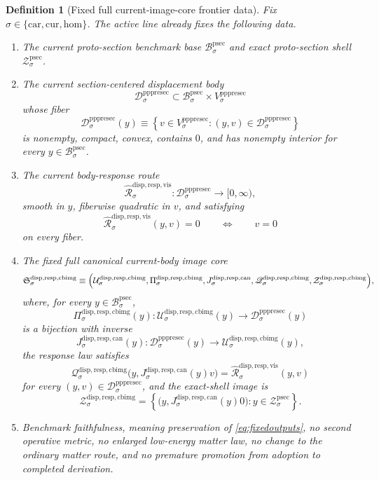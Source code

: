 \documentclass[11pt]{article}
\newcommand{\Car}{\mathrm{car}}
\newcommand{\Cur}{\mathrm{cur}}
\newcommand{\Hom}{\mathrm{hom}}
\newcommand{\ProtoSectionBody}[1]{\mathcal B_{#1}^{\mathrm{psec}}}
\newcommand{\ProtoSectionShell}[1]{\mathcal Z_{#1}^{\mathrm{psec}}}
\newcommand{\PrePreProtoSectionVertical}[1]{V_{#1}^{\mathrm{pppresec}}}
\newcommand{\PrePreProtoSectionResidualBody}[1]{\mathcal D_{#1}^{\mathrm{pppresec}}}
\newcommand{\CurrentBodyImageCore}{\mathfrak S^{\mathrm{disp,resp,cbimg}}}
\newcommand{\ImageProjection}[1]{\Pi_{#1}^{\mathrm{disp,resp,cbimg}}}
\newcommand{\CanonicalLift}[1]{J_{#1}^{\mathrm{disp,resp,can}}}
\newcommand{\CanonicalImageBody}[1]{\mathcal U_{#1}^{\mathrm{disp,resp,cbimg}}}
\newcommand{\CanonicalImageResponseLaw}[1]{\mathscr Q_{#1}^{\mathrm{disp,resp,cbimg}}}
\newcommand{\CanonicalImageShell}[1]{\mathcal Z_{#1}^{\mathrm{disp,resp,cbimg}}}
\newcommand{\CoreForcedBodyResponse}[1]{\widehat{\mathscr R}_{#1}^{\mathrm{disp,resp,vis}}}
\newtheorem{definition}{Definition}
\begin{document}
\begin{definition}[Fixed full current-image-core frontier data]
\label{def:frontier}
Fix \(\sigma\in\{\Car,\Cur,\Hom\}\). The active line already fixes the following data.
\begin{enumerate}
    \item The current proto-section benchmark base \(\ProtoSectionBody{\sigma}\) and exact proto-section shell \(\ProtoSectionShell{\sigma}\).
    \item The current section-centered displacement body
    \[
    \PrePreProtoSectionResidualBody{\sigma}
    \subset
    \ProtoSectionBody{\sigma}\times\PrePreProtoSectionVertical{\sigma}
    \]
    whose fiber
    \[
    \PrePreProtoSectionResidualBody{\sigma}(y)
    \equiv
    \left\{
    v\in\PrePreProtoSectionVertical{\sigma}:(y,v)\in\PrePreProtoSectionResidualBody{\sigma}
    \right\}
    \]
    is nonempty, compact, convex, contains \(0\), and has nonempty interior for every \(y\in\ProtoSectionBody{\sigma}\).
    \item The current body-response route
    \[
    \CoreForcedBodyResponse{\sigma}:
    \PrePreProtoSectionResidualBody{\sigma}\to[0,\infty),
    \]
    smooth in \(y\), fiberwise quadratic in \(v\), and satisfying
    \[
    \CoreForcedBodyResponse{\sigma}(y,v)=0
    \qquad\Longleftrightarrow\qquad
    v=0
    \]
    on every fiber.
    \item The fixed full canonical current-body image core
    \[
    \CurrentBodyImageCore_{\sigma}
    \equiv
    \Bigl(
    \CanonicalImageBody{\sigma},
    \ImageProjection{\sigma},
    \CanonicalLift{\sigma},
    \CanonicalImageResponseLaw{\sigma},
    \CanonicalImageShell{\sigma}
    \Bigr),
    \]
    where, for every \(y\in\ProtoSectionBody{\sigma}\),
    \[
    \ImageProjection{\sigma}(y):
    \CanonicalImageBody{\sigma}(y)\to\PrePreProtoSectionResidualBody{\sigma}(y)
    \]
    is a bijection with inverse
    \[
    \CanonicalLift{\sigma}(y):
    \PrePreProtoSectionResidualBody{\sigma}(y)\to\CanonicalImageBody{\sigma}(y),
    \]
    the response law satisfies
    \begin{equation}
    \CanonicalImageResponseLaw{\sigma}\bigl(y,\CanonicalLift{\sigma}(y)v\bigr)
    =
    \CoreForcedBodyResponse{\sigma}(y,v)
    \label{eq:imagepullback}
    \end{equation}
    for every \((y,v)\in\PrePreProtoSectionResidualBody{\sigma}\), and the exact-shell image is
    \[
    \CanonicalImageShell{\sigma}
    =
    \left\{
    \bigl(y,\CanonicalLift{\sigma}(y)0\bigr):
    y\in\ProtoSectionShell{\sigma}
    \right\}.
    \]
    \item Benchmark faithfulness, meaning preservation of \eqref{eq:fixedoutputs}, no second operative metric, no enlarged low-energy matter law, no change to the ordinary matter route, and no premature promotion from adoption to completed derivation.
\end{enumerate}
\end{definition}
\end{document}
